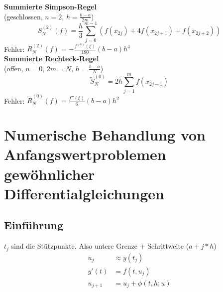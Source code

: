 \documentclass[
	ngerman,
	accentcolor=9c,%
	type=intern,
	marginpar=false
	]{tudapub}
\begin{document}
    
    \textbf{Summierte Simpson-Regel}\\
    (geschlossen, $n = 2$, $h=\frac{b-a}{2m}$)
    \begin{equation*}
        S^{(2)}_N(f)=\dfrac{h}{3}\sum^{m-1}_{j=0}(f(x_{2j}) + 4f(x_{2j+1}) + f(x_{2j+2}))
    \end{equation*}
    Fehler: $R^{(2)}_N(f)=-\frac{f^{(4)}(\xi)}{180}(b-a)h^4$\\[2ex]

    \textbf{Summierte Rechteck-Regel}\\
    (offen, $n=0$, $2m = N$, $h = \frac{b-a}{N}$)
    \begin{equation*}
        \tilde{S}_N^{(0)} = 2h \sum^m_{j=1} f(x_{2j-1})
    \end{equation*}
    Fehler: $\tilde{R}^{(0)}_N(f)= \frac{f''(\xi)}{6}(b-a)h^2$
    \newpage

\section{Numerische Behandlung von Anfangswertproblemen gewöhnlicher Differentialgleichungen}
    \subsection{Einführung}
            $t_j$ sind die Stützpunkte. Also untere Grenze + Schrittweite ($a + j*h$)
            \begin{align*}
                u_j &\approx y(t_j)\\
                y'(t) &= f(t,u_j)\\
                u_{j+1} &= u_j + \phi(t,h;u)
            \end{align*}
\end{document}

